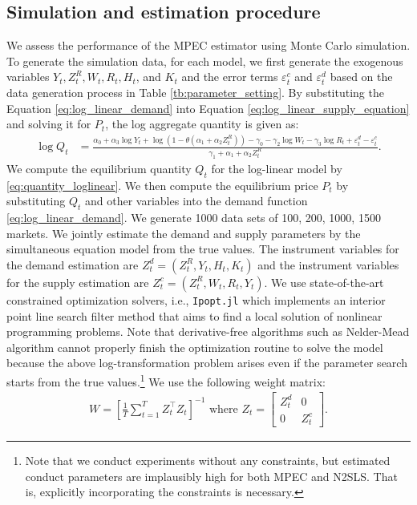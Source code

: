 \documentclass[11pt, a4paper]{article}
\begin{document}
\subsection{Simulation and estimation procedure}\label{sec:setting}
We assess the performance of the MPEC estimator using Monte Carlo simulation.
To generate the simulation data, for each model, we first generate the exogenous variables $Y_t, Z^{R}_{t}, W_t, R_{t}, H_t$, and $K_t$ and the error terms $\varepsilon_{t}^c$ and $\varepsilon_{t}^d$ based on the data generation process in Table \ref{tb:parameter_setting}.
By substituting the Equation \eqref{eq:log_linear_demand} into Equation \eqref{eq:log_linear_supply_equation} and solving it for $P_{t}$, the log aggregate quantity is given as: 
\begin{align}
    \log Q_t &= \frac{ \alpha_0 + \alpha_3 \log Y_t + \log (1 - \theta (\alpha_1 + \alpha_2 Z^{R}_{t})) - \gamma_0  -  \gamma_2 \log W_{t} - \gamma_3 \log R_t + \varepsilon^{d}_{t} - \varepsilon^{c}_{t}}{\gamma_1+ \alpha_1 + \alpha_2 Z^{R}_{t} }.\label{eq:quantity_loglinear}
\end{align}
We compute the equilibrium quantity $Q_{t}$ for the log-linear model by \eqref{eq:quantity_loglinear}.
We then compute the equilibrium price $P_t$ by substituting $Q_{t}$ and other variables into the demand function \eqref{eq:log_linear_demand}.
We generate 1000 data sets of 100, 200, 1000, 1500 markets.
We jointly estimate the demand and supply parameters by the simultaneous equation model \citep{wooldridge2010econometric} from the true values.
The instrument variables for the demand estimation are $Z^{d}_{t} = (Z^{R}_{t}, Y_t, H_{t}, K_{t})$ and the instrument variables for the supply estimation are $Z^{c}_{t} = (Z^{R}_{t}, W_{t}, R_{t}, Y_t)$. 
We use state-of-the-art constrained optimization solvers, i.e., \texttt{Ipopt.jl} which implements an interior point line search filter method that aims to find a local solution of nonlinear programming problems.
Note that derivative-free algorithms such as Nelder-Mead algorithm cannot properly finish the optimization routine to solve the model because the above log-transformation problem arises even if the parameter search starts from the true values.\footnote{Note that we conduct experiments without any constraints, but estimated conduct parameters are implausibly high for both MPEC and N2SLS. That is, explicitly incorporating the constraints is necessary.}
We use the following weight matrix:
\begin{align}
    W = \left[\frac{1}{T}\sum_{t = 1}^T Z_t^\top Z_t\right]^{-1} \text{ where } Z_{t}=\left[\begin{array}{ll}
        Z_{t}^{d} & 0 \\
        0 & Z_{t}^{c}
    \end{array}\right].\label{eq:weight_matrix}
\end{align}
\end{document}
